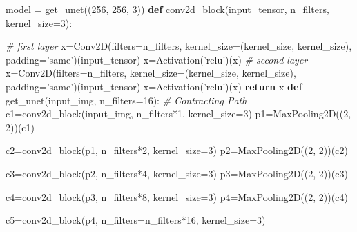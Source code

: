 \documentclass[11pt]{article}
\newenvironment{Shaded}{}{}
\newcommand{\KeywordTok}[1]{\textcolor[rgb]{0.00,0.44,0.13}{\textbf{{#1}}}}
\newcommand{\DecValTok}[1]{\textcolor[rgb]{0.25,0.63,0.44}{{#1}}}
\newcommand{\StringTok}[1]{\textcolor[rgb]{0.25,0.44,0.63}{{#1}}}
\newcommand{\CommentTok}[1]{\textcolor[rgb]{0.38,0.63,0.69}{\textit{{#1}}}}
\newcommand{\NormalTok}[1]{{#1}}
\newcommand{\ControlFlowTok}[1]{\textcolor[rgb]{0.00,0.44,0.13}{\textbf{{#1}}}}
\newcommand{\OperatorTok}[1]{\textcolor[rgb]{0.40,0.40,0.40}{{#1}}}
\begin{document}
\begin{Shaded}
\begin{Highlighting}[]
\NormalTok{model }\OperatorTok{=}\NormalTok{ get_unet((}\DecValTok{256}\NormalTok{, }\DecValTok{256}\NormalTok{, }\DecValTok{3}\NormalTok{))}
\KeywordTok{def}\NormalTok{ conv2d_block(input_tensor, n_filters, kernel_size}\OperatorTok{=}\DecValTok{3}\NormalTok{):}
 
 \CommentTok{# first layer}
\NormalTok{ x}\OperatorTok{=}\NormalTok{Conv2D(filters}\OperatorTok{=}\NormalTok{n_filters, kernel_size}\OperatorTok{=}\NormalTok{(kernel_size, kernel_size),}
\NormalTok{ padding}\OperatorTok{=}\StringTok{'same'}\NormalTok{)(input_tensor)}
\NormalTok{ x}\OperatorTok{=}\NormalTok{Activation(}\StringTok{'relu'}\NormalTok{)(x)}
 \CommentTok{# second layer}
\NormalTok{ x}\OperatorTok{=}\NormalTok{Conv2D(filters}\OperatorTok{=}\NormalTok{n_filters, kernel_size}\OperatorTok{=}\NormalTok{(kernel_size, kernel_size),}
\NormalTok{ padding}\OperatorTok{=}\StringTok{'same'}\NormalTok{)(input_tensor)}
\NormalTok{ x}\OperatorTok{=}\NormalTok{Activation(}\StringTok{'relu'}\NormalTok{)(x)}
 \ControlFlowTok{return}\NormalTok{ x}
\KeywordTok{def}\NormalTok{ get_unet(input_img, n_filters}\OperatorTok{=}\DecValTok{16}\NormalTok{):}
 \CommentTok{# Contracting Path}
\NormalTok{ c1}\OperatorTok{=}\NormalTok{conv2d_block(input_img, n_filters}\OperatorTok{*}\DecValTok{1}\NormalTok{, kernel_size}\OperatorTok{=}\DecValTok{3}\NormalTok{)}
\NormalTok{ p1}\OperatorTok{=}\NormalTok{MaxPooling2D((}\DecValTok{2}\NormalTok{, }\DecValTok{2}\NormalTok{))(c1)}

\NormalTok{ c2}\OperatorTok{=}\NormalTok{conv2d_block(p1, n_filters}\OperatorTok{*}\DecValTok{2}\NormalTok{, kernel_size}\OperatorTok{=}\DecValTok{3}\NormalTok{)}
\NormalTok{ p2}\OperatorTok{=}\NormalTok{MaxPooling2D((}\DecValTok{2}\NormalTok{, }\DecValTok{2}\NormalTok{))(c2)}
 
\NormalTok{ c3}\OperatorTok{=}\NormalTok{conv2d_block(p2, n_filters}\OperatorTok{*}\DecValTok{4}\NormalTok{, kernel_size}\OperatorTok{=}\DecValTok{3}\NormalTok{)}
\NormalTok{ p3}\OperatorTok{=}\NormalTok{MaxPooling2D((}\DecValTok{2}\NormalTok{, }\DecValTok{2}\NormalTok{))(c3)}

\NormalTok{ c4}\OperatorTok{=}\NormalTok{conv2d_block(p3, n_filters}\OperatorTok{*}\DecValTok{8}\NormalTok{, kernel_size}\OperatorTok{=}\DecValTok{3}\NormalTok{)}
\NormalTok{ p4}\OperatorTok{=}\NormalTok{MaxPooling2D((}\DecValTok{2}\NormalTok{, }\DecValTok{2}\NormalTok{))(c4)}

\NormalTok{ c5}\OperatorTok{=}\NormalTok{conv2d_block(p4, n_filters}\OperatorTok{=}\NormalTok{n_filters}\OperatorTok{*}\DecValTok{16}\NormalTok{, kernel_size}\OperatorTok{=}\DecValTok{3}\NormalTok{)}


\end{Highlighting}
\end{Shaded}
\end{document}
